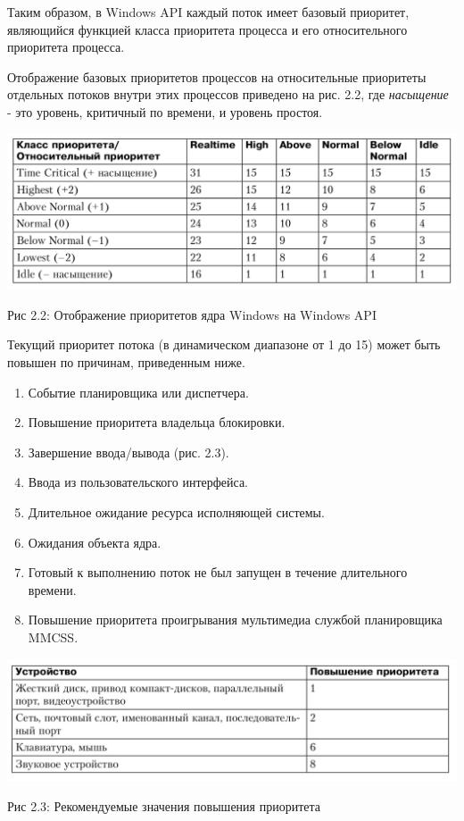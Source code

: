 \documentclass[12pt]{report}
\begin{document}
Таким образом, в Windows API каждый поток имеет базовый приоритет, являющийся функцией класса приоритета процесса и его относительного приоритета процесса.

Отображение базовых приоритетов процессов на относительные приоритеты отдельных потоков внутри этих процессов приведено на рис. 2.2, где \textit{насыщение} - это уровень, критичный по времени, и уровень простоя.

\begin{center}
		\includegraphics[scale=0.6]{pics/table_Wind_priority.png}
		
			Рис 2.2: Отображение приоритетов ядра Windows на Windows API
\end{center}

Текущий приоритет потока (в динамическом диапазоне от 1 до 15) может быть повышен по причинам, приведенным ниже.
\begin{enumerate}
\item Событие планировщика или диспетчера.
\item Повышение приоритета владельца блокировки.
\item Завершение ввода/вывода (рис. 2.3).
\item Ввода из пользовательского интерфейса.
\item Длительное ожидание ресурса исполняющей системы.
\item Ожидания объекта ядра.
\item Готовый к выполнению поток не был запущен в течение длительного времени.
\item Повышение приоритета проигрывания мультимедиа службой планировщика MMCSS.
\end{enumerate}

\begin{center}
		\includegraphics[scale=0.6]{pics/Recommend_InOut.png}
		
			Рис 2.3: Рекомендуемые значения повышения приоритета
\end{center}
\end{document}
